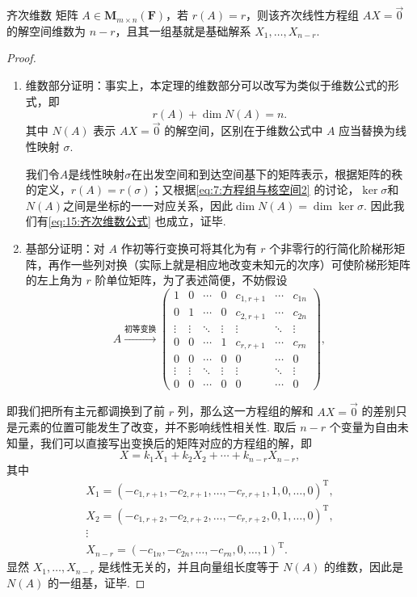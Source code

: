 \begin{theorem}{}{齐次维数}
    矩阵 $A \in \mathbf{M}_{m \times n}(\mathbf{F})$，若 $r(A) = r$，则该齐次线性方程组 $AX = \vec{0}$ 的解空间维数为 $n - r$，且其一组基就是基础解系 $X_1,\ldots,X_{n-r}$.
\end{theorem}
\begin{proof}
    \begin{enumerate}
        \item 维数部分证明：事实上，本定理的维数部分可以改写为类似于维数公式的形式，即
        \begin{equation}\label{eq:15:齐次维数公式}
            r(A) + \dim N(A) = n.
        \end{equation}
        其中 $N(A)$ 表示 $AX=\vec{0}$ 的解空间，区别在于维数公式中 $A$ 应当替换为线性映射 $\sigma$.

        我们令$A$是线性映射$\sigma$在出发空间和到达空间基下的矩阵表示，根据矩阵的秩的定义，$r(A)=r(\sigma)$；又根据\autoref{eq:7:方程组与核空间2} 的讨论，$\ker\sigma$和$N(A)$之间是坐标的一一对应关系，因此$\dim N(A)=\dim\ker\sigma$. 因此我们有\autoref{eq:15:齐次维数公式} 也成立，证毕.

        \item 基部分证明：对 $A$ 作初等行变换可将其化为有 $r$ 个非零行的行简化阶梯形矩阵，再作一些列对换（实际上就是相应地改变未知元的次序）可使阶梯形矩阵的左上角为 $r$ 阶单位矩阵，为了表述简便，不妨假设
        \[A \xrightarrow{\text{初等变换}}\begin{pmatrix}
            1 & 0 & \cdots & 0 & c_{1,r+1} & \cdots & c_{1n} \\
            0 & 1 & \cdots & 0 & c_{2,r+1} & \cdots & c_{2n} \\
            \vdots & \vdots & \ddots & \vdots & \vdots & \ddots & \vdots \\
            0 & 0 & \cdots & 1 & c_{r,r+1} & \cdots & c_{rn} \\
            0 & 0 & \cdots & 0 & 0 & \cdots & 0 \\
            \vdots & \vdots & \ddots & \vdots & \vdots & \ddots & \vdots \\
            0 & 0 & \cdots & 0 & 0 & \cdots & 0
        \end{pmatrix},\]
    \end{enumerate}
    即我们把所有主元都调换到了前 $r$ 列，那么这一方程组的解和 $AX = \vec{0}$ 的差别只是元素的位置可能发生了改变，并不影响线性相关性. 取后 $n - r$ 个变量为自由未知量，我们可以直接写出变换后的矩阵对应的方程组的解，即
    \[X = k_1X_1 + k_2X_2 + \cdots + k_{n-r}X_{n-r},\]
    其中
    \begin{gather*}
        X_1 = (-c_{1,r+1},-c_{2,r+1},\ldots,-c_{r,r+1},1,0,\ldots,0)^\mathrm{T},\\
        X_2 = (-c_{1,r+2},-c_{2,r+2},\ldots,-c_{r,r+2},0,1,\ldots,0)^\mathrm{T},\\
        \vdots\\
        X_{n-r} = (-c_{1n},-c_{2n},\ldots,-c_{rn},0,\ldots,1)^\mathrm{T}.
    \end{gather*}
    显然 $X_1,\ldots,X_{n-r}$ 是线性无关的，并且向量组长度等于 $N(A)$ 的维数，因此是 $N(A)$ 的一组基，证毕.
\end{proof}

